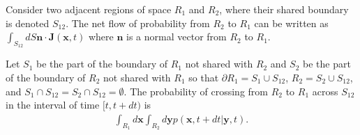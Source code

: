 \documentclass{article}
\newcommand{\mb}{\mathbf}
\begin{document}
\begin{claim} \label{probcurrent}
Consider two adjacent regions of space $R_1$ and $R_2$, where their shared boundary is denoted $S_{12}$. The net flow of probability from $R_2$ to $R_1$ can be written as $\int_{S_{12}} dS {\mb n}\cdot {\mb J}({\mb x},t) $ where ${\mb n}$ is a normal vector from $R_2$ to $R_1$.  
\end{claim}

\begin{pf}
Let $S_1$ be the part of the boundary of $R_1$ not shared with $R_2$ and $S_2$ be the part of the boundary of $R_2$ not shared with $R_1$ so that  $\partial R_1=S_1\cup S_{12}$, $R_2=S_2\cup S_{12}$, and $S_1\cap S_{12}=S_2\cap S_{12}=\emptyset$. The probability of crossing from $R_2$ to $R_1$ across $S_{12}$ in the interval of time $[t,t+dt)$ is 
\begin{align*}
\int_{R_1}d{\mb x}\int_{R_2}d{\mb y} p({\mb x},t+dt|{\mb y},t).
\end{align*}




\end{pf}
\end{document}
